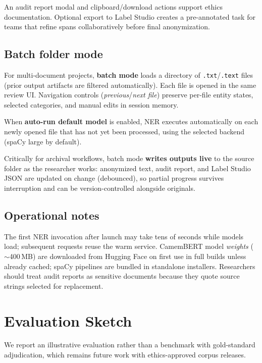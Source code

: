 \documentclass[11pt,a4paper]{article}
\begin{document}
An audit report modal and clipboard/download actions support ethics documentation.
Optional export to Label Studio creates a pre-annotated task for teams that refine
spans collaboratively before final anonymization.

\subsection{Batch folder mode}

For multi-document projects, \textbf{batch mode} loads a directory of
\texttt{.txt}/\texttt{.text} files (prior output artifacts are filtered automatically).
Each file is opened in the same review UI.
Navigation controls (\emph{previous}/\emph{next file}) preserve per-file entity
states, selected categories, and manual edits in session memory.

When \textbf{auto-run default model} is enabled, NER executes automatically on
each newly opened file that has not yet been processed, using the selected backend
(spaCy large by default).

Critically for archival workflows, batch mode \textbf{writes outputs live} to the
source folder as the researcher works:
anonymized text, audit report, and Label Studio JSON are updated on change
(debounced), so partial progress survives interruption and can be version-controlled
alongside originals.

\subsection{Operational notes}

The first NER invocation after launch may take tens of seconds while models load;
subsequent requests reuse the warm service.
CamemBERT model \emph{weights} ($\sim$400\,MB) are downloaded from Hugging Face on
first use in full builds unless already cached; spaCy pipelines are bundled in
standalone installers.
Researchers should treat audit reports as sensitive documents because they quote
source strings selected for replacement.

\section{Evaluation Sketch}
\label{sec:evaluation}

We report an illustrative evaluation rather than a benchmark with gold-standard
adjudication, which remains future work with ethics-approved corpus releases.
\end{document}
